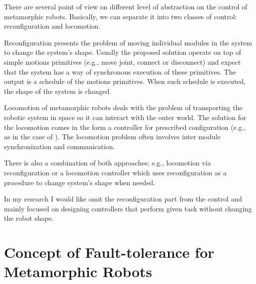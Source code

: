 There are several point of view on different level of abstraction on the control
of metamorphic robots. Basically, we can separate it into two classes of
control: reconfiguration and locomotion.

Reconfiguration presents the problem of moving individual modules in the system
to change the system's shape. Usually the proposed solution operate on top of
simple motions primitives (e.g., move joint, connect or disconnect) and expect
that the system has a way of synchronous execution of these primitives. The
output is a schedule of the motions primitives. When such schedule is
executed, the shape of the system is changed. 

Locomotion of metamorphic robots deals with the problem of transporting the
robotic system in space so it can interact with the outer world. The solution
for the locomotion comes in the form a controller for prescribed configuration
(e.g., as in the case of ). The locomotion problem often involves
inter module synchronization and communication.

There is also a combination of both approaches; e.g., locomotion via
reconfiguration or a locomotion controller which uses reconfiguration as a
procedure to change system's shape when needed.

In my research I would like omit the reconfiguration part from the control and
mainly focused on designing controllers that perform given task without changing
the robot shape.

\section{Concept of Fault-tolerance for Metamorphic Robots}




